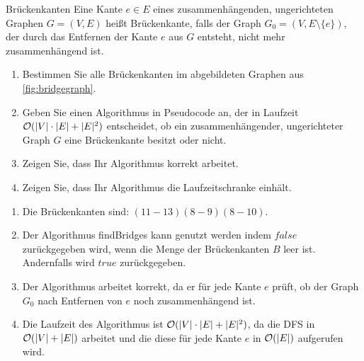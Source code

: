 \documentclass{article}
\begin{document}
\begin{exercise}{Brückenkanten}
  Eine Kante $e \in E$ eines zusammenhängenden, ungerichteten Graphen $G = (V, E)$ heißt Brückenkante, falls der Graph $G_0 = (V, E \setminus \{e\})$, der durch das Entfernen der Kante $e$ aus $G$ entsteht, nicht mehr zusammenhängend ist.
  
  \begin{enumerate}
    \item Bestimmen Sie alle Brückenkanten im abgebildeten Graphen aus \ref{fig:bridgegraph}.
    \item Geben Sie einen Algorithmus in Pseudocode an, der in Laufzeit $\mathcal{O}(|V| \cdot |E| + |E|^2)$ entscheidet, ob ein zusammenhängender, ungerichteter Graph $G$ eine Brückenkante besitzt oder nicht.
    \item Zeigen Sie, dass Ihr Algorithmus korrekt arbeitet.
    \item Zeigen Sie, dass Ihr Algorithmus die Laufzeitschranke einhält.
  \end{enumerate}

  \begin{solution}
    \begin{enumerate}
      \item Die Brückenkanten sind: $(11-13) (8-9) (8-10)$.
      \item Der Algorithmus findBridges kann genutzt werden indem $false$ zurückgegeben wird, wenn die Menge der Brückenkanten $B$ leer ist. Andernfalls wird $true$ zurückgegeben.\par
            
      \item Der Algorithmus arbeitet korrekt, da er für jede Kante $e$ prüft, ob der Graph $G_0$ nach Entfernen von $e$ noch zusammenhängend ist.
      \item Die Laufzeit des Algorithmus ist $\mathcal{O}(|V| \cdot |E| + |E|^2)$, da die DFS in $\mathcal{O}(|V| + |E|)$ arbeitet und die diese für jede Kante $e$ in $\mathcal{O}(|E|)$ aufgerufen wird.
    \end{enumerate}
  \end{solution}
\end{exercise}
\end{document}

